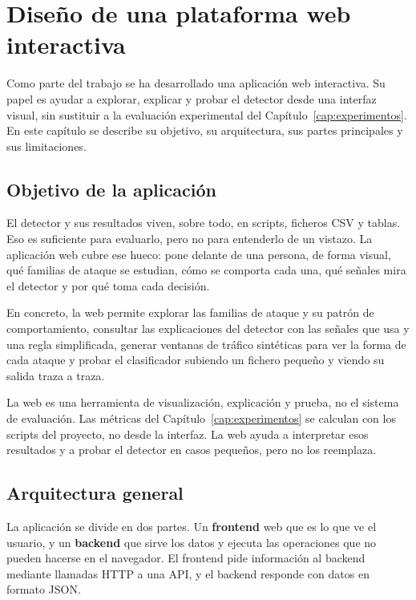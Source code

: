 \chapter{Diseño de una plataforma web interactiva}
\label{cap:web}

Como parte del trabajo se ha desarrollado una aplicación web interactiva. Su papel es ayudar a explorar, explicar y probar el detector desde una interfaz visual, sin sustituir a la evaluación experimental del Capítulo~\ref{cap:experimentos}. En este capítulo se describe su objetivo, su arquitectura, sus partes principales y sus limitaciones.

\section{Objetivo de la aplicación}
\label{sec:web_objetivo}

El detector y sus resultados viven, sobre todo, en scripts, ficheros CSV y tablas. Eso es suficiente para evaluarlo, pero no para entenderlo de un vistazo. La aplicación web cubre ese hueco: pone delante de una persona, de forma visual, qué familias de ataque se estudian, cómo se comporta cada una, qué señales mira el detector y por qué toma cada decisión.

En concreto, la web permite explorar las familias de ataque y su patrón de comportamiento, consultar las explicaciones del detector con las señales que usa y una regla simplificada, generar ventanas de tráfico sintéticas para ver la forma de cada ataque y probar el clasificador subiendo un fichero pequeño y viendo su salida traza a traza.

La web es una herramienta de visualización, explicación y prueba, no el sistema de evaluación. Las métricas del Capítulo~\ref{cap:experimentos} se calculan con los scripts del proyecto, no desde la interfaz. La web ayuda a interpretar esos resultados y a probar el detector en casos pequeños, pero no los reemplaza.

\section{Arquitectura general}
\label{sec:web_arquitectura}

La aplicación se divide en dos partes. Un \textbf{frontend} web que es lo que ve el usuario, y un \textbf{backend} que sirve los datos y ejecuta las operaciones que no pueden hacerse en el navegador. El frontend pide información al backend mediante llamadas HTTP a una API, y el backend responde con datos en formato JSON.

